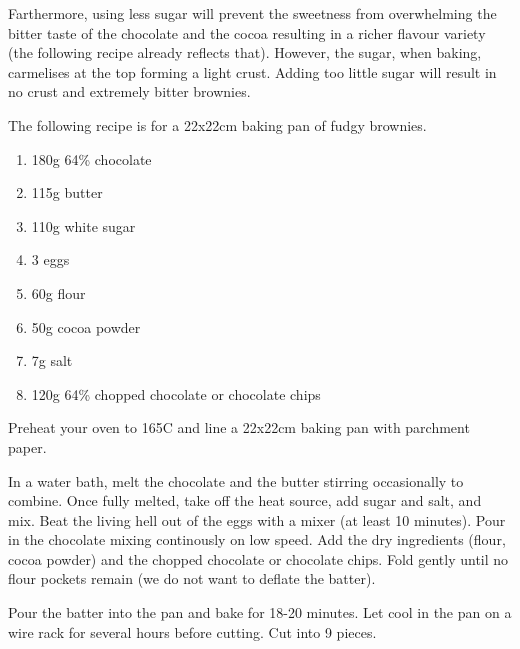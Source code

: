 Farthermore, using less sugar will prevent the sweetness from overwhelming the
bitter taste of the chocolate and the cocoa resulting in a richer flavour
variety (the following recipe already reflects that). However, the sugar, when
baking, carmelises at the top forming a light crust. Adding too little sugar
will result in no crust and extremely bitter brownies.

The following recipe is for a 22x22cm baking pan of fudgy brownies.

\begin{enumerate}
  \item 180g 64\% chocolate
  \item 115g butter
  \item 110g white sugar
  \item 3 eggs
  \item 60g flour
  \item 50g cocoa powder
  \item 7g salt
  \item 120g 64\% chopped chocolate or chocolate chips
\end{enumerate}

Preheat your oven to 165C and line a 22x22cm baking pan with parchment paper.

In a water bath, melt the chocolate and the butter stirring occasionally to
combine. Once fully melted, take off the heat source, add sugar and salt, and
mix. Beat the living hell out of the eggs with a mixer (at least 10 minutes).
Pour in the chocolate mixing continously on low speed. Add the dry ingredients
(flour, cocoa powder) and the chopped chocolate or chocolate chips. Fold gently
until no flour pockets remain (we do not want to deflate the batter).

Pour the batter into the pan and bake for 18-20 minutes. Let cool in the pan on
a wire rack for several hours before cutting. Cut into 9 pieces.
